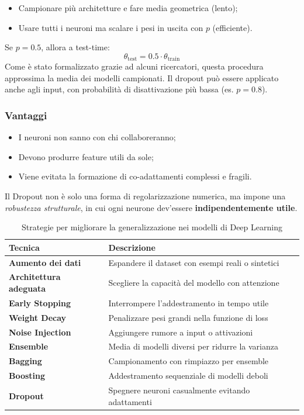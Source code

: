 \begin{itemize}
    \item Campionare più architetture e fare media geometrica (lento);
    \item Usare tutti i neuroni ma scalare i pesi in uscita con \( p \) (efficiente).
\end{itemize}

Se \( p = 0.5 \), allora a test-time:
\[
\theta_\text{test} = 0.5 \cdot \theta_\text{train}
\]
Come è stato formalizzato grazie ad alcuni ricercatori, questa procedura approssima la media dei modelli campionati. Il dropout può essere applicato anche agli input, con probabilità di disattivazione più bassa (es. $p=0.8$).

\subsubsection{Vantaggi}
\begin{itemize}
\item I neuroni non sanno con chi collaboreranno;
\item Devono produrre feature utili da sole;
\item Viene evitata la formazione di co-adattamenti complessi e fragili.
\end{itemize}

Il Dropout non è solo una forma di regolarizzazione numerica, ma impone una \emph{robustezza strutturale}, in cui ogni neurone dev’essere \textbf{indipendentemente utile}.

\begin{table}[h]
    \centering
    \caption{Strategie per migliorare la generalizzazione nei modelli di Deep Learning}
    \begin{adjustbox}{width=\textwidth}
    \begin{tabular}{@{}l|l@{}}
    \toprule
    \textbf{Tecnica} & \textbf{Descrizione} \\
    \midrule
    \textbf{Aumento dei dati} & Espandere il dataset con esempi reali o sintetici \\
    \textbf{Architettura adeguata} & Scegliere la capacità del modello con attenzione \\
    \textbf{Early Stopping} & Interrompere l’addestramento in tempo utile \\
    \textbf{Weight Decay} & Penalizzare pesi grandi nella funzione di loss \\
    \textbf{Noise Injection} & Aggiungere rumore a input o attivazioni \\
    \textbf{Ensemble} & Media di modelli diversi per ridurre la varianza \\
    \textbf{Bagging} & Campionamento con rimpiazzo per ensemble \\
    \textbf{Boosting} & Addestramento sequenziale di modelli deboli \\
    \textbf{Dropout} & Spegnere neuroni casualmente evitando adattamenti \\
    \bottomrule
    \end{tabular}
    \end{adjustbox}
\end{table}
